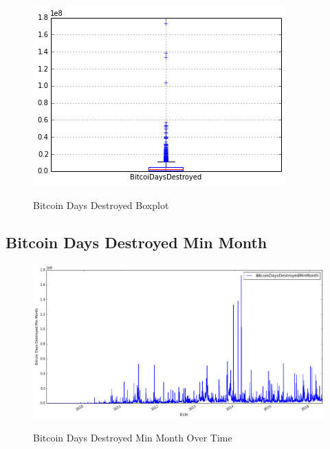 \begin{figure}[bth]
  \myfloatalign
  {\includegraphics[width=1\linewidth]
    {gfx/bitcoin-days-destroyed-boxplot}}
  \caption{Bitcoin Days Destroyed Boxplot}
  \label{fig:bitcoin-days-destroyed-boxplot}
\end{figure}

\clearpage


\subsection{Bitcoin Days Destroyed Min Month}
\label{sec:bitcoin-days-destroyed-min-month}

\begin{figure}[bth]
  \myfloatalign
  {\includegraphics[width=1\linewidth]
    {gfx/bitcoin-days-destroyed-min-month-over-time}}
  \caption{Bitcoin Days Destroyed Min Month Over Time}
  \label{fig:bitcoin-days-destroyed-min-month-over-time}
\end{figure}

